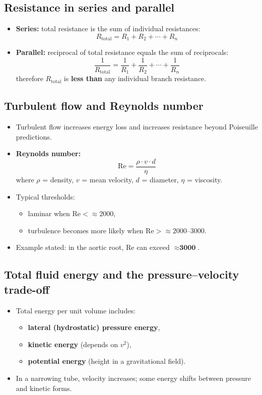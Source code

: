 \documentclass[11pt,a4paper]{article}
\begin{document}
\subsection{Resistance in series and parallel}
\begin{itemize}
\item \textbf{Series:} total resistance is the sum of individual resistances:
  \[
  R_{\text{total}} = R_1 + R_2 + \cdots + R_n
  \]
\item \textbf{Parallel:} reciprocal of total resistance equals the sum of reciprocals:
  \[
  \frac{1}{R_{\text{total}}} = \frac{1}{R_1} + \frac{1}{R_2} + \cdots + \frac{1}{R_n}
  \]
  therefore $R_{\text{total}}$ is \textbf{less than} any individual branch resistance.
\end{itemize}

\subsection{Turbulent flow and Reynolds number}
\begin{itemize}
\item Turbulent flow increases energy loss and increases resistance beyond Poiseuille predictions.
\item \textbf{Reynolds number:}
  \[
  \mathrm{Re} = \frac{\rho \cdot v \cdot d}{\eta}
  \]
  where $\rho$ = density, $v$ = mean velocity, $d$ = diameter, $\eta$ = viscosity.
\item Typical thresholds:
  \begin{itemize}
  \item laminar when $\mathrm{Re} < \approx 2000$,
  \item turbulence becomes more likely when $\mathrm{Re} > \approx 2000$--3000.
  \end{itemize}
\item Example stated: in the aortic root, $\mathrm{Re}$ can exceed $\approx \textbf{3000}$.
\end{itemize}

\subsection{Total fluid energy and the pressure--velocity trade-off}
\begin{itemize}
\item Total energy per unit volume includes:
  \begin{itemize}
  \item \textbf{lateral (hydrostatic) pressure energy},
  \item \textbf{kinetic energy} (depends on $v^2$),
  \item \textbf{potential energy} (height in a gravitational field).
  \end{itemize}
\item In a narrowing tube, velocity increases; some energy shifts between pressure and kinetic forms.
\end{itemize}
\end{document}
